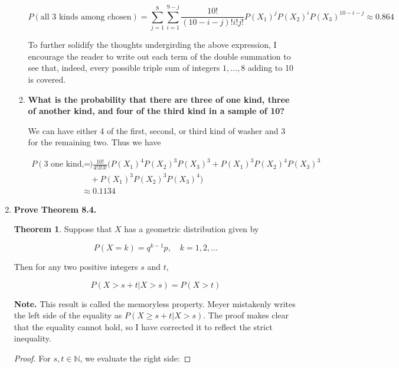 \documentclass[10pt, oneside]{article}   	%
\theoremstyle{definition}
\newtheorem*{thm*}{Theorem}
\begin{document}
\begin{enumerate}[label=8.\arabic*]
\begin{enumerate}
	\[ P(\text{all 3 kinds among chosen}) = \sum^8_{j=1} \sum^{9-j}_{i=1} \frac{10!}{(10-i-j)! i! j!} P(X_1)^j P(X_2)^i P(X_3)^{10-i-j} \approx \boxed{ 0.864} \] 
	
	To further solidify the thoughts undergirding the above expression, I encourage the reader to write out each term of the double summation to see that, indeed, every possible triple sum of integers $1,...,8$ adding to 10 is covered.
	
	\item  \begin{tcolorbox}[
	  colback=Cerulean!5!white,
	  colframe=Cerulean!75!black]
	\textbf{What is the probability that there are three of one kind, three of another kind, and four of the third kind in a sample of 10?}
	\end{tcolorbox}
	
	We can have either 4 of the first, second, or third kind of washer and 3 for the remaining two. Thus we have
	
	\begin{align*}
	P(\text{3 one kind, 3 second kind, 4 third kind}) &= \frac{10!}{4! 3! 3!} (P(X_1)^4 P(X_2)^3 P(X_3)^3 + P(X_1)^3 P(X_2)^4 P(X_3)^3 \\
	&\quad + P(X_1)^3 P(X_2)^3 P(X_3)^4 ) \\
	&\approx \boxed{0.1134}
	\end{align*}
	\end{enumerate}

\item  \begin{tcolorbox}[
  colback=Cerulean!5!white,
  colframe=Cerulean!75!black]
\textbf{Prove Theorem 8.4.}
\end{tcolorbox}

\begin{thm*}
Suppose that $X$ has a geometric distribution given by

\[ P(X = k) = q^{k-1} p, \quad k = 1, 2, ... \]

Then for any two positive integers $s$ and $t$,

\[ P(X > s + t | X > s) = P(X > t) \]
\end{thm*}

\textbf{Note.} This result is called the memoryless property. Meyer mistakenly writes the left side of the equality as $P(X \geq s+t | X > s)$. The proof makes clear that the equality cannot hold, so I have corrected it to reflect the strict inequality.

\begin{proof}
For $s, t \in \mathbb{N}$, we evaluate the right side:


\end{proof}
\end{enumerate}
\end{document}
